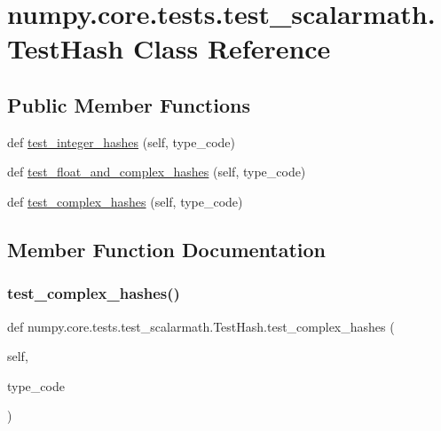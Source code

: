 \hypertarget{classnumpy_1_1core_1_1tests_1_1test__scalarmath_1_1TestHash}{}\section{numpy.\+core.\+tests.\+test\+\_\+scalarmath.\+Test\+Hash Class Reference}
\label{classnumpy_1_1core_1_1tests_1_1test__scalarmath_1_1TestHash}
\subsection*{Public Member Functions}
\begin{DoxyCompactItemize}
\item 
def \hyperlink{classnumpy_1_1core_1_1tests_1_1test__scalarmath_1_1TestHash_a4bd151fd355a3f3f3029e4c47e33f53a}{test\+\_\+integer\+\_\+hashes} (self, type\+\_\+code)
\item 
def \hyperlink{classnumpy_1_1core_1_1tests_1_1test__scalarmath_1_1TestHash_af275c29628e996086fa3545a044ba8a4}{test\+\_\+float\+\_\+and\+\_\+complex\+\_\+hashes} (self, type\+\_\+code)
\item 
def \hyperlink{classnumpy_1_1core_1_1tests_1_1test__scalarmath_1_1TestHash_af52f1490b4338761a4df13976b728b17}{test\+\_\+complex\+\_\+hashes} (self, type\+\_\+code)
\end{DoxyCompactItemize}


\subsection{Member Function Documentation}
\mbox{\label{classnumpy_1_1core_1_1tests_1_1test__scalarmath_1_1TestHash_af52f1490b4338761a4df13976b728b17}} 
\subsubsection{\texorpdfstring{test\+\_\+complex\+\_\+hashes()}{test\_complex\_hashes()}}
{\footnotesize\ttfamily def numpy.\+core.\+tests.\+test\+\_\+scalarmath.\+Test\+Hash.\+test\+\_\+complex\+\_\+hashes (\begin{DoxyParamCaption}\item[{}]{self,  }\item[{}]{type\+\_\+code }\end{DoxyParamCaption})}

